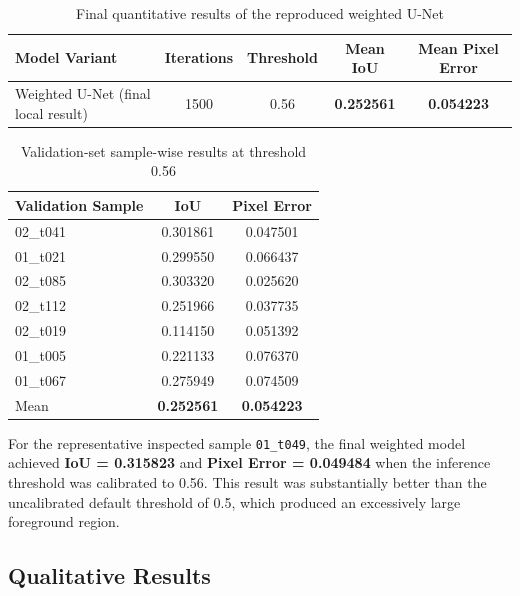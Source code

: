 \documentclass[11pt]{article}
\newcommand{\best}[1]{\textbf{#1}}
\begin{document}
\begin{table}[H]
\centering
\caption{Final quantitative results of the reproduced weighted U-Net}
\begin{tabular}{lcccc}
\toprule
Model Variant & Iterations & Threshold & Mean IoU & Mean Pixel Error \\
\midrule
Weighted U-Net (final local result) & 1500 & 0.56 & \best{0.252561} & \best{0.054223} \\
\bottomrule
\end{tabular}
\end{table}

\begin{table}[H]
\centering
\caption{Validation-set sample-wise results at threshold 0.56}
\begin{tabular}{lcc}
\toprule
Validation Sample & IoU & Pixel Error \\
\midrule
02\_t041 & 0.301861 & 0.047501 \\
01\_t021 & 0.299550 & 0.066437 \\
02\_t085 & 0.303320 & 0.025620 \\
02\_t112 & 0.251966 & 0.037735 \\
02\_t019 & 0.114150 & 0.051392 \\
01\_t005 & 0.221133 & 0.076370 \\
01\_t067 & 0.275949 & 0.074509 \\
\midrule
Mean & \best{0.252561} & \best{0.054223} \\
\bottomrule
\end{tabular}
\end{table}

For the representative inspected sample \texttt{01\_t049}, the final weighted model achieved \textbf{IoU = 0.315823} and \textbf{Pixel Error = 0.049484} when the inference threshold was calibrated to 0.56. This result was substantially better than the uncalibrated default threshold of 0.5, which produced an excessively large foreground region.

\subsection{Qualitative Results}
\end{document}
